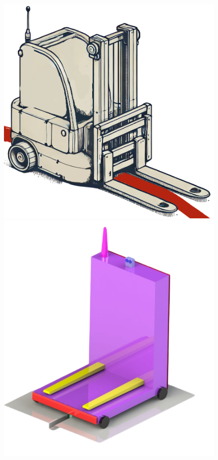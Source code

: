 \documentclass[12pt]{article}
\begin{document}
\begin{figure}[h!]
    \centering
    \begin{minipage}{0.32\textwidth}
        \centering
        \includegraphics[width=\textwidth]{Simple_sketch_of_an_automated_forklift_robot_with_two_wheels_at_the_back_and_one_wheel_in_the_front.png}
    \end{minipage}%
    \hspace{0.01\textwidth}
    \begin{minipage}{0.32\textwidth}
        \centering
        \includegraphics[width=\textwidth]{anna&will's design (1).png}

\end{minipage}
\end{figure}
\end{document}
